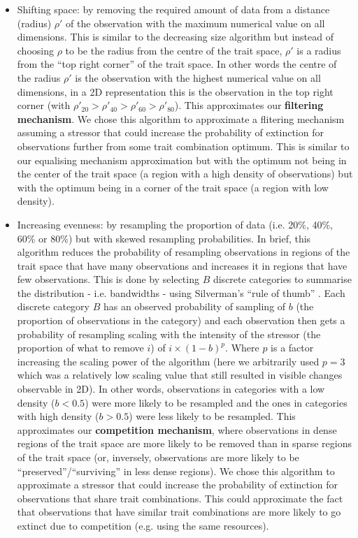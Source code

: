 \documentclass[12pt,letterpaper]{article}
\begin{document}
\begin{itemize}
\item Shifting space: by removing the required amount of data from a distance (radius) $\rho'$ of the observation with the maximum numerical value on all dimensions.
This is similar to the decreasing size algorithm but instead of choosing $\rho$ to be the radius from the centre of the trait space, $\rho'$ is a radius from the ``top right corner'' of the trait space.
In other words the centre of the radius $\rho'$ is the observation with the highest numerical value on all dimensions, in a 2D representation this is the observation in the top right corner (with $\rho'_{20} > \rho'_{40} > \rho'_{60} > \rho'_{80}$).
This approximates our \textbf{filtering mechanism}.
We chose this algorithm to approximate a flitering mechanism assuming a stressor that could increase the probability of extinction for observations further from some trait combination optimum.
This is similar to our equalising mechanism approximation but with the optimum not being in the center of the trait space (a region with a high density of observations) but with the optimum being in a corner of the trait space (a region with low density).

\item Increasing evenness: by resampling the proportion of data (i.e. 20\%, 40\%, 60\% or 80\%) but with skewed resampling probabilities.
In brief, this algorithm reduces the probability of resampling observations in regions of the trait space that have many observations and increases it in regions that have few observations.
This is done by selecting $B$ discrete categories to summarise the distribution - i.e. bandwidths - using Silverman's ``rule of thumb'' \citep[\texttt{bw.nrd0} function in \texttt{R};][]{silverman1986density}.
Each discrete category $B$ has an observed probability of sampling of $b$ (the proportion of observations in the category) and each observation then gets a probability of resampling scaling with the intensity of the stressor (the proportion of what to remove $i$) of $i \times (1-b)^{p}$. 
Where $p$ is a factor increasing the scaling power of the algorithm (here we arbitrarily used $p=3$ which was a relatively low scaling value that still resulted in visible changes observable in 2D).
In other words, observations in categories with a low density ($b<0.5$) were more likely to be resampled and the ones in categories with high density ($b>0.5$) were less likely to be resampled.
This approximates our \textbf{competition mechanism}, where observations in dense regions of the trait space are more likely to be removed than in sparse regions of the trait space (or, inversely, observations are more likely to be ``preserved''/``surviving'' in less dense regions).
We chose this algorithm to approximate a stressor that could increase the probability of extinction for observations that share trait combinations.
This could approximate the fact that observations that have similar trait combinations are more likely to go extinct due to competition (e.g. using the same resources). 
\end{itemize}
\end{document}

